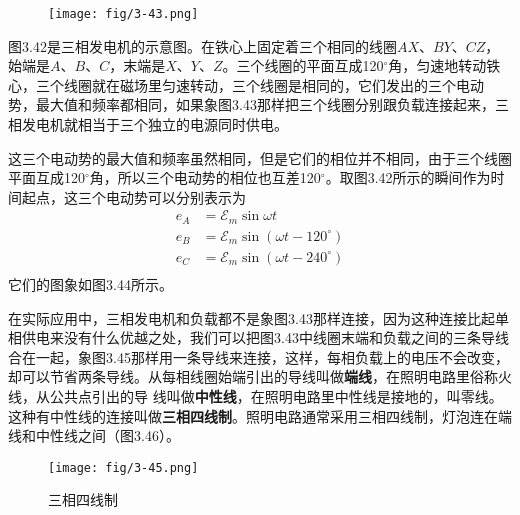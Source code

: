 \begin{figure}[htp]\centering
\texttt{[image: fig/3-43.png]}
\caption{}
\end{figure}

图3.42是三相发电机的示意图。在铁心上固定着三个相同的线圈$AX$、$BY$、$CZ$，始端是$A$、$B$、$C$，末端是$X$、$Y$、$Z$。三个线圈的平面互成120$^\circ$角，匀速地转动铁心，三个线圈就在磁场里匀速转动，三个线圈是相同的，它们发出的三个电动
势，最大值和频率都相同，如果象图3.43那样把三个线圈分别跟负载连接起来，三相发电机就相当于三个独立的电源同时供电。

这三个电动势的最大值和频率虽然相同，但是它们的相位并不相同，由于三个线圈平面互成120$^\circ$角，所以三个电动势的相位也互差120$^\circ$。取图3.42所示的瞬间作为时间起点，这三个电动势可以分别表示为
\[\begin{split}
e_A&=\mathcal{E}_m\sin \omega t\\
e_B&=\mathcal{E}_m\sin (\omega t-120^\circ)\\
e_C&=\mathcal{E}_m\sin (\omega t-240^\circ)\\
\end{split}\]
它们的图象如图3.44所示。
\begin{figure}[htp]\centering
\caption{}
\end{figure}

在实际应用中，三相发电机和负载都不是象图3.43那样连接，因为这种连接比起单相供电来没有什么优越之处，我们可以把图3.43中线圈末端和负载之间的三条导线合在一起，象图3.45那样用一条导线来连接，这样，每相负载上的电压不会改变，却可以节省两条导线。从每相线圈始端引出的导线叫做\textbf{端线}，在照明电路里俗称火线，从公共点引出的导
线叫做\textbf{中性线}，在照明电路里中性线是接地的，叫零线。这种有中性线的连接叫做\textbf{三相四线制}。照明电路通常采用三相四线制，灯泡连在端线和中性线之间（图3.46）。
\begin{figure}[htp]\centering
\texttt{[image: fig/3-45.png]}
\caption{三相四线制}
\end{figure}


